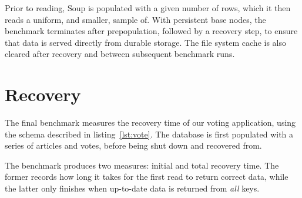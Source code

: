 Prior to reading, Soup is populated with a given number of rows, which it then
reads a uniform, and smaller, sample of. With persistent base nodes, the
benchmark terminates after prepopulation, followed by a recovery step, to ensure
that data is served directly from durable storage. The file system cache is also
cleared after recovery and between subsequent benchmark runs.

\section{Recovery}\label{sec:bench-recovery}

The final benchmark measures the recovery time of our voting application, using
the schema described in listing~\ref{lst:vote}. The database is first populated
with a series of articles and votes, before being shut down and recovered from.

The benchmark produces two measures: initial and total recovery time. The former
records how long it takes for the first read to return correct data, while the
latter only finishes when up-to-date data is returned from \textit{all} keys.

